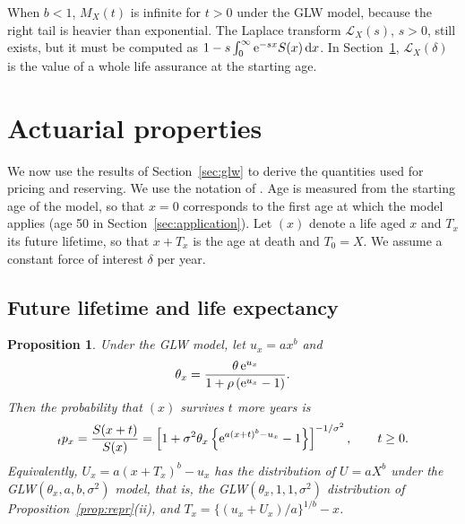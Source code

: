 \documentclass[12pt]{article}
\newcommand{\e}{{\rm e}}         %
\newcommand{\dd}{{\rm d}}        %
\newtheorem{proposition}{Proposition}
\begin{document}
When $b<1$, $M_X(t)$ is infinite for $t>0$ under the GLW model, because the right tail is heavier than exponential. The Laplace transform $\mathcal{L}_X(s)$, $s>0$, still exists, but it must be computed as $1-s\int_0^\infty\e^{-sx}S(x)\,\dd x$. In Section~\ref{sec:actuarial}, $\mathcal{L}_X(\delta)$ is the value of a whole life assurance at the starting age.

\section{Actuarial properties}\label{sec:actuarial}

We now use the results of Section~\ref{sec:glw} to derive the quantities used for pricing and reserving. We use the notation of \citet{dickson2019actuarial}. Age is measured from the starting age of the model, so that $x=0$ corresponds to the first age at which the model applies (age 50 in Section~\ref{sec:application}). Let $(x)$ denote a life aged $x$ and $T_x$ its future lifetime, so that $x+T_x$ is the age at death and $T_0=X$. We assume a constant force of interest $\delta$ per year.

\subsection{Future lifetime and life expectancy}

\begin{proposition}\label{prop:future}
Under the GLW model, let $u_x=ax^b$ and
\[
\theta_x=\frac{\theta\,\e^{u_x}}{1+\rho\,(\e^{u_x}-1)}.
\]
Then the probability that $(x)$ survives $t$ more years is
\[
{}_tp_x=\frac{S(x+t)}{S(x)}=\left[1+\sigma^2\theta_x\left\{\e^{a(x+t)^b-u_x}-1\right\}\right]^{-1/\sigma^2},\qquad t\geq0.
\]
Equivalently, $U_x=a(x+T_x)^b-u_x$ has the distribution of $U=aX^b$ under the GLW$(\theta_x,a,b,\sigma^2)$ model, that is, the GLW$(\theta_x,1,1,\sigma^2)$ distribution of Proposition~\ref{prop:repr}(ii), and $T_x=\{(u_x+U_x)/a\}^{1/b}-x$.
\end{proposition}
\end{document}
